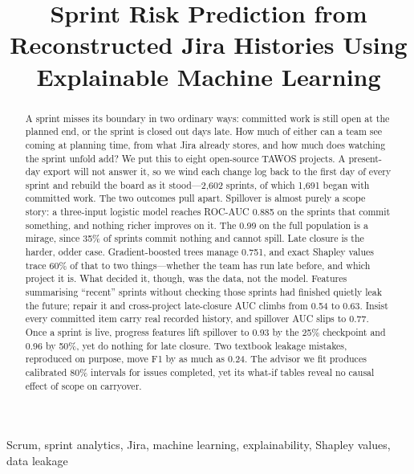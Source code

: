 \documentclass[conference]{IEEEtran}
\begin{document}
\title{Sprint Risk Prediction from Reconstructed Jira Histories Using Explainable Machine Learning}
\author{
\and
{}
}
\date{}
\maketitle


\begin{abstract}
A sprint misses its boundary in two ordinary ways: committed work is still open at the planned end, or the sprint is closed out days late. How much of either can a team see coming at planning time, from what Jira already stores, and how much does watching the sprint unfold add? We put this to eight open-source TAWOS projects. A present-day export will not answer it, so we wind each change log back to the first day of every sprint and rebuild the board as it stood---2,602 sprints, of which 1,691 began with committed work. The two outcomes pull apart. Spillover is almost purely a scope story: a three-input logistic model reaches ROC-AUC 0.885 on the sprints that commit something, and nothing richer improves on it. The 0.99 on the full population is a mirage, since 35\% of sprints commit nothing and cannot spill. Late closure is the harder, odder case. Gradient-boosted trees manage 0.751, and exact Shapley values trace 60\% of that to two things---whether the team has run late before, and which project it is. What decided it, though, was the data, not the model. Features summarising ``recent'' sprints without checking those sprints had finished quietly leak the future; repair it and cross-project late-closure AUC climbs from 0.54 to 0.63. Insist every committed item carry real recorded history, and spillover AUC slips to 0.77. Once a sprint is live, progress features lift spillover to 0.93 by the 25\% checkpoint and 0.96 by 50\%, yet do nothing for late closure. Two textbook leakage mistakes, reproduced on purpose, move F1 by as much as 0.24. The advisor we fit produces calibrated 80\% intervals for issues completed, yet its what-if tables reveal no causal effect of scope on carryover.
\end{abstract}

\begin{IEEEkeywords}
Scrum, sprint analytics, Jira, machine learning, explainability, Shapley values, data leakage
\end{IEEEkeywords}
\end{document}
